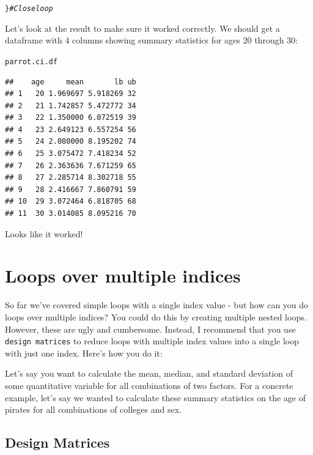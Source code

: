 \documentclass{tufte-book}\usepackage[]{graphicx}\usepackage[]{color}
\makeatletter
\newcommand{\hlcom}[1]{\textcolor[rgb]{0.678,0.584,0.686}{\textit{#1}}}%
\newcommand{\hlstd}[1]{\textcolor[rgb]{0.345,0.345,0.345}{#1}}%
\newenvironment{kframe}{%
 \def\at@end@of@kframe{}%
 \ifinner\ifhmode%
  \def\at@end@of@kframe{\end{minipage}}%
  \begin{minipage}{\columnwidth}%
 \fi\fi%
 \def\FrameCommand##1{\hskip\@totalleftmargin \hskip-\fboxsep
 \colorbox{shadecolor}{##1}\hskip-\fboxsep
     \hskip-\linewidth \hskip-\@totalleftmargin \hskip\columnwidth}%
 \MakeFramed {\advance\hsize-\width
   \@totalleftmargin\z@ \linewidth\hsize
   \@setminipage}}%
 {\par\unskip\endMakeFramed%
 \at@end@of@kframe}
\newenvironment{knitrout}{}{} %
\makeatother
\begin{document}
\begin{footnotesize}
\begin{knitrout}
\begin{kframe}
\begin{alltt}
\hlstd{\}} \hlcom{# Close loop}
\end{alltt}
\end{kframe}
\end{knitrout}

Let's look at the result to make sure it worked correctly. We should get a dataframe with 4 columns showing summary statistics for ages 20 through 30:

\begin{knitrout}
\color{fgcolor}\begin{kframe}
\begin{alltt}
\hlstd{parrot.ci.df}
\end{alltt}
\begin{verbatim}
##    age     mean       lb ub
## 1   20 1.969697 5.918269 32
## 2   21 1.742857 5.472772 34
## 3   22 1.350000 6.072519 39
## 4   23 2.649123 6.557254 56
## 5   24 2.080000 8.195202 74
## 6   25 3.075472 7.418234 52
## 7   26 2.363636 7.671259 65
## 8   27 2.285714 8.302718 55
## 9   28 2.416667 7.860791 59
## 10  29 3.072464 6.818705 68
## 11  30 3.014085 8.095216 70
\end{verbatim}
\end{kframe}
\end{knitrout}

Looks like it worked!


\section{Loops over multiple indices}

So far we've covered simple loops with a single index value - but how can you do loops over multiple indices? You could do this by creating multiple nested loops. However, these are ugly and cumbersome. Instead, I recommend that you use \texttt{design matrices} to reduce loops with multiple index values into a single loop with just one index. Here's how you do it:

Let's say you want to calculate the mean, median, and standard deviation of some quantitative variable for all combinations of two factors. For a concrete example, let's say we wanted to calculate these summary statistics on the age of pirates for all combinations of colleges and sex.

\subsection{Design Matrices}


\end{footnotesize}
\end{document}
